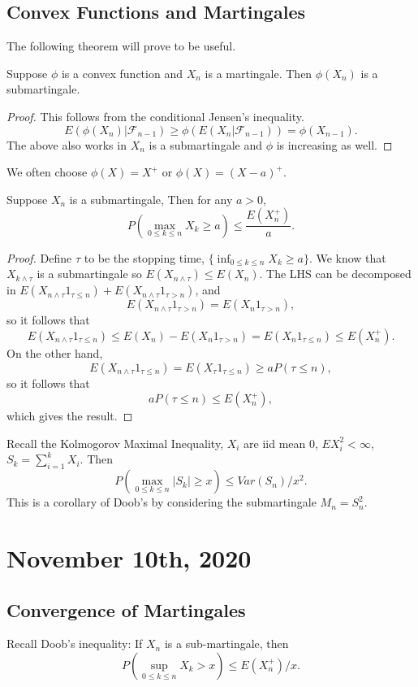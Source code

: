 \documentclass[11pt]{scrartcl}
\let \mc \mathcal
\begin{document}
\subsection{Convex Functions and Martingales}
The following theorem will prove to be useful.
\begin{thm} Suppose $\phi$ is a convex function and $X_n$ is a martingale.  Then $\phi(X_n)$ is a submartingale.
\end{thm}
\begin{proof}
This follows from the conditional Jensen's inequality. 
$$E(\phi(X_n)| \mc F_{n-1}) \ge \phi(E(X_n|\mc F_{n-1})) = \phi(X_{n-1}).$$
The above also works in $X_n$ is a submartingale and $\phi$ is increasing as well.
\end{proof}
We often choose $\phi(X) = X^+$ or $\phi(X) = (X-a)^+$.
\begin{thm}  Suppose $X_n$ is a submartingale,  Then for any $a > 0$, 
$$P(\max_{0 \le k \le n} X_k \ge a) \le \frac{E(X_n^+)}{a}.$$
\end{thm}
\begin{proof}
Define $\tau$ to be the stopping time, $\{\inf_{0 \le k \le n} X_k \ge a \}$.  We know that $X_{k \wedge \tau}$ is a submartingale so $E(X_{n \wedge \tau}) \le E(X_n)$.  The LHS can be decomposed in $E(X_{n \wedge \tau}1_{\tau \le n}) + E(X_{n \wedge \tau}1_{\tau > n})$, and $$E(X_{n \wedge \tau}1_{\tau > n}) = E(X_n 1_{\tau > n}),$$
so it follows that 
$$E(X_{n \wedge \tau}1_{\tau \le n}) \le E(X_n) - E(X_n 1_{\tau > n}) = E(X_n 1_{\tau \le n}) \le E(X_n^+).$$
On the other hand, 
$$E(X_{n \wedge \tau}1_{\tau \le n}) = E(X_\tau 1_{\tau \le n}) \ge a P(\tau \le n),$$
so it follows that 
$$aP(\tau \le n) \le E(X_n^+),$$
which gives the result.
\end{proof}
\begin{remark} Recall the Kolmogorov Maximal Inequality, $X_i$ are iid mean $0$, $EX_i^2 < \infty$, $S_k = \sum_{i=1}^k X_i$.  Then $$P(\max_{0 \le k \le n} |S_k| \ge x) \le Var(S_n)/x^2.$$
This is a corollary of Doob's by considering the submartingale $M_n = S_n^2$.
\end{remark}


\pagebreak
\section{November 10th, 2020}
\subsection{Convergence of Martingales}
Recall Doob's inequality: If $X_n$ is a sub-martingale, then $$P(\sup_{0 \le k \le n} X_k > x) \le E(X_n^+)/x.$$
\end{document}
